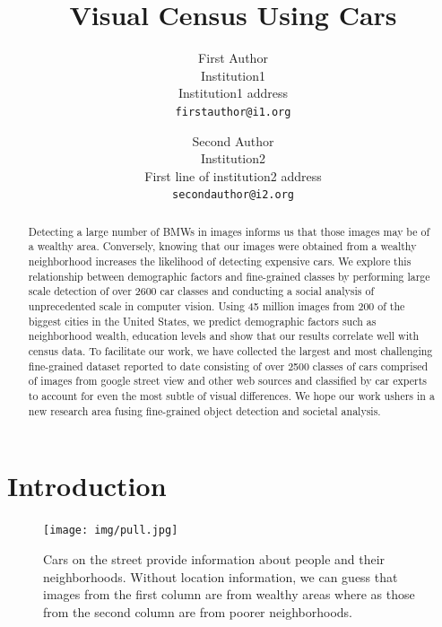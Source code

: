 \documentclass[10pt,twocolumn,letterpaper]{article}
\begin{document}
\title{Visual Census Using Cars}

\author{First Author\\
Institution1\\
Institution1 address\\
{\tt\small firstauthor@i1.org}
\and
Second Author\\
Institution2\\
First line of institution2 address\\
{\tt\small secondauthor@i2.org}
}

\maketitle

\begin{abstract}
Detecting a large number of BMWs in images informs us that those images may be of a wealthy area. Conversely, knowing that our images were obtained from a wealthy neighborhood increases the likelihood of detecting expensive cars. We explore this relationship between demographic factors and fine-grained classes by performing large scale detection of over 2600 car classes and conducting a social analysis of unprecedented scale in computer vision. Using 45 million images from 200 of the biggest cities in the United States, we predict demographic factors such as neighborhood wealth, education levels and show that our results correlate well with census data. To facilitate our work, we have collected the largest and most challenging fine-grained dataset reported to date consisting of over 2500 classes of cars comprised of images from google street view and other web sources and classified by car experts to account for even the most subtle of visual differences. We hope our work ushers in a new research area fusing fine-grained object detection and societal analysis.

\end{abstract}

\section{Introduction}
\begin{figure}[t]
\begin{center}
   \texttt{[image: img/pull.jpg]}
\end{center}
   \caption{Cars on the street provide information about people and their neighborhoods. Without location information, we can guess that images from the first column are from wealthy areas where as those from the second column are from poorer neighborhoods.}
\label{fig:pull}
\end{figure}
\end{document}
